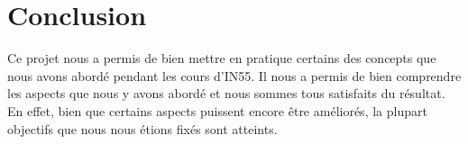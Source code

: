 \chapter*{Conclusion}
Ce projet nous a permis de bien mettre en pratique certains des concepts que
nous avons abordé pendant les cours d'IN55. Il nous a permis de bien
comprendre les aspects que nous y avons abordé et nous sommes tous
satisfaits du résultat. En effet, bien que certains aspects puissent encore être
améliorés, la plupart objectifs que nous nous étions fixés sont atteints.
